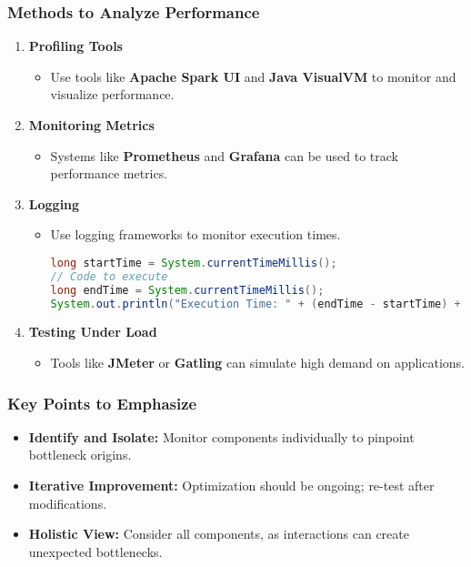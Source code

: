 \documentclass[aspectratio=169]{beamer}
\begin{document}
\begin{frame}[fragile]
    \frametitle{Methods to Analyze Performance}
    \begin{enumerate}
        \item \textbf{Profiling Tools}
            \begin{itemize}
                \item Use tools like \textbf{Apache Spark UI} and \textbf{Java VisualVM} to monitor and visualize performance.
            \end{itemize}
        \item \textbf{Monitoring Metrics}
            \begin{itemize}
                \item Systems like \textbf{Prometheus} and \textbf{Grafana} can be used to track performance metrics.
            \end{itemize}
        \item \textbf{Logging}
            \begin{itemize}
                \item Use logging frameworks to monitor execution times.
                \begin{lstlisting}[language=Java]
long startTime = System.currentTimeMillis();
// Code to execute
long endTime = System.currentTimeMillis();
System.out.println("Execution Time: " + (endTime - startTime) + " ms");
                \end{lstlisting}
            \end{itemize}
        \item \textbf{Testing Under Load}
            \begin{itemize}
                \item Tools like \textbf{JMeter} or \textbf{Gatling} can simulate high demand on applications.
            \end{itemize}
    \end{enumerate}
\end{frame}

\begin{frame}[fragile]
    \frametitle{Key Points to Emphasize}
    \begin{itemize}
        \item \textbf{Identify and Isolate:} Monitor components individually to pinpoint bottleneck origins.
        \item \textbf{Iterative Improvement:} Optimization should be ongoing; re-test after modifications.
        \item \textbf{Holistic View:} Consider all components, as interactions can create unexpected bottlenecks.
    \end{itemize}
\end{frame}
\end{document}
